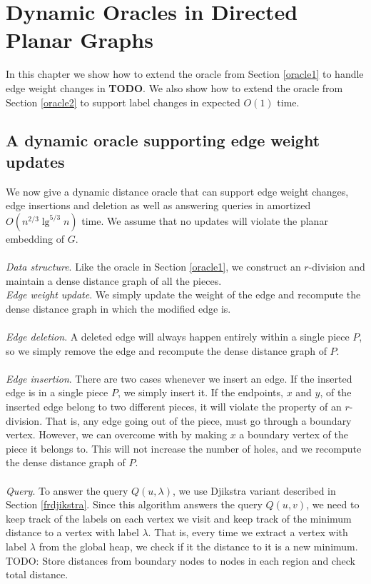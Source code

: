 \section{Dynamic Oracles in Directed Planar Graphs}\label{dynamicPlanar}
In this chapter we show how to extend the oracle from Section \ref{oracle1} to handle
edge weight changes in \textbf{TODO}. We also show how to extend the oracle from Section
\ref{oracle2} to support label changes in expected $O(1)$ time.

\subsection{A dynamic oracle supporting edge weight updates}\label{oracle3}
We now give a dynamic distance oracle that can support edge weight changes, edge
insertions and deletion as well as answering queries in amortized $O(n^{2/3}\lg^{5/3}n)$
time. We assume that no updates will violate the planar embedding of $G$. \\
\\
\indent \textit{Data structure}.
Like the oracle in Section \ref{oracle1}, we construct an $r$-division and maintain a
dense distance graph of all the pieces.  \\

\indent \textit{Edge weight update}.
We simply update the weight of the edge and recompute the dense distance graph in which
the modified edge is. \\
\\
\indent \textit{Edge deletion}.
A deleted edge will always happen entirely within a single piece $P$, so we simply remove
the edge and recompute the dense distance graph of $P$. \\
\\
\indent \textit{Edge insertion}.
There are two cases whenever we insert an edge. If the inserted edge is in a single piece
$P$, we simply insert it. If the endpoints, $x$ and $y$, of the inserted edge belong to two different
pieces, it will violate the property of an $r$-division. That is, any edge going out of
the piece, must go through a boundary vertex. However, we can overcome with by making $x$
a boundary vertex of the piece it belongs to. This will not increase the number of holes,
and we recompute the dense distance graph of $P$. \\
\\
\indent \textit{Query}. To answer the query $Q(u,\lambda)$, we use Djikstra variant
described in Section \ref{frdjikstra}. Since this algorithm answers the query $Q(u,v)$,
we need to keep track of the labels on each vertex we visit and keep track of the minimum
distance to a vertex with label $\lambda$. That is, every time we
extract a vertex with label $\lambda$ from the global heap, we check if it the distance
to it is a new minimum. TODO: Store distances from boundary nodes to nodes in each region
and check total distance.

